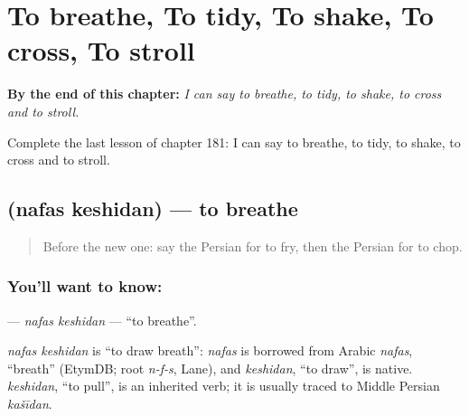 
\chapter{To breathe, To tidy, To shake, To cross, To stroll}
\label{ch:fa-to-breathe-to-tidy-to-shake-to-cross-to-stroll}

\begin{chapteropening}
\textbf{By the end of this chapter:} \emph{I can say to breathe, to tidy, to shake, to cross and to stroll.}

Complete the last lesson of chapter 181: I can say to breathe, to tidy, to shake, to cross and to stroll.
\end{chapteropening}

\section[\texorpdfstring{\fa{نفس} \fa{کشیدن} (nafas keshidan)}{نفس کشیدن (nafas keshidan)}]{  (nafas keshidan) — to breathe}

\label{lesson:FA-C181-nafas-keshidan}



\begin{quote}
Before the new one: say the Persian for to fry, then the Persian for to chop.
\end{quote}

\subsection*{You'll want to know:  }
\textbf{ } — \emph{nafas keshidan} — \textquotedblleft{}to breathe\textquotedblright{}.

\begin{cousinweb}
\emph{nafas keshidan} is \textquotedblleft{}to draw breath\textquotedblright{}: \emph{nafas} is borrowed from Arabic \emph{nafas}, \textquotedblleft{}breath\textquotedblright{} (EtymDB; root \emph{n-f-s}, Lane), and \emph{keshidan}, \textquotedblleft{}to draw\textquotedblright{}, is native. \emph{keshidan}, \textquotedblleft{}to pull\textquotedblright{}, is an inherited verb; it is usually traced to Middle Persian \emph{kašīdan}.
\end{cousinweb}

